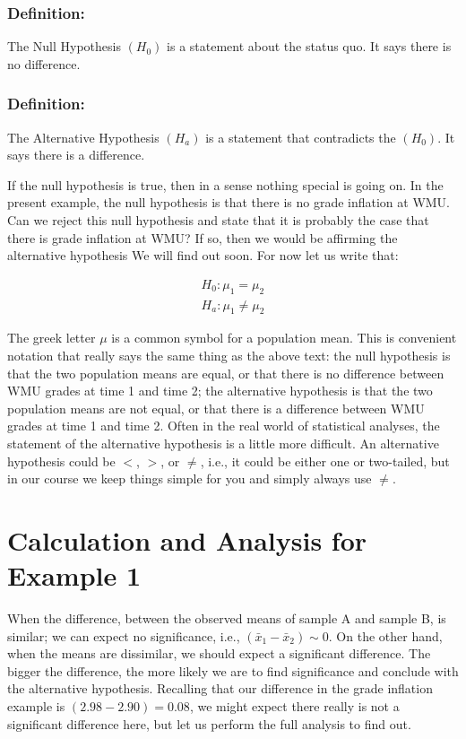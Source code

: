 \documentclass[11pt]{book}\usepackage[]{graphicx}\usepackage[]{color}
\begin{document}
\subsubsection{Definition:} The Null Hypothesis $(H_0)$ is a statement about the status quo. It says there is no difference.

\subsubsection{Definition:} The Alternative Hypothesis $(H_a)$ is a statement that contradicts the $(H_0)$. It says there is a difference.

If the null hypothesis is true, then in a sense nothing special is going on. In the present example, the null hypothesis is that there is no grade inflation at WMU. Can we reject this null hypothesis and state that it is probably the case that there is grade inflation at WMU? If so, then we would be affirming the alternative hypothesis We will find out soon. For now let us write that:

\begin{eqnarray*}
H_0: \mu_1 = \mu_2 \\
H_a: \mu_1 \ne \mu_2 
\end{eqnarray*}

The greek letter $\mu$ is a common symbol for a population mean. This is convenient notation that really says the same thing as the above text: the null hypothesis is that the two population means are equal, or that there is no difference between WMU grades at time 1 and time 2; the alternative hypothesis is that the two population means are not equal, or that there is a difference between WMU grades at time 1 and time 2. Often in the real world of statistical analyses, the statement of the alternative hypothesis is a little more difficult. An alternative hypothesis could be $<$, $>$, or $\ne$, i.e., it could be either one or two-tailed, but in our course we keep things simple for you and simply always use $\ne$.

\section{Calculation and Analysis for Example 1}

When the difference, between the observed means of sample A and sample B, is similar; we can expect no significance, i.e., $(\bar{x}_1 - \bar{x}_2) \sim 0 $.   On the other hand, when the means are
dissimilar, we should expect a significant difference. The bigger the difference, the more likely we are to find significance and conclude with the alternative hypothesis. Recalling that our difference in the grade inflation example is $(2.98 - 2.90) = 0.08$, we might expect there really is not a significant difference here, but let us perform the full analysis to find out.
\end{document}
